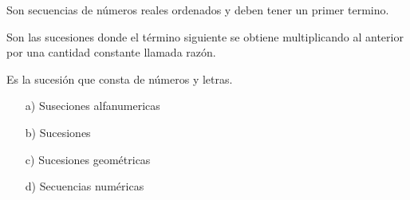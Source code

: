 
\begin{multicols}{2}
  \question Son secuencias de números reales ordenados y deben tener un
            primer termino.

  \question Son las sucesiones donde el término siguiente se obtiene
            multiplicando al anterior por una cantidad constante llamada
            razón.

  \question Es la sucesión que consta de números y letras.

\columnbreak

  \begin{enumerate}
    \item[a)] Suseciones alfanumericas
    \vspace{\baselineskip}
    \item[b)] Sucesiones
    \vspace{\baselineskip}
    \item[c)] Sucesiones geométricas
    \vspace{\baselineskip}
    \item[d)] Secuencias numéricas
  \end{enumerate}
\end{multicols}
